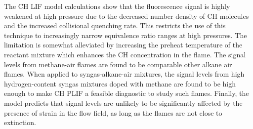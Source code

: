 The CH LIF model calculations show that the fluorescence signal is highly weakened at high pressure due to the decreased number density of CH molecules and the increased collisional quenching rate.
This restricts the use of this technique to increasingly narrow equivalence ratio ranges at high pressures.
The limitation is somewhat alleviated by increasing the preheat temperature of the reactant mixture which enhances the CH concentration in the flame.
The signal levels from methane-air flames are found to be comparable other alkane air flames.
When applied to syngas-alkane-air mixtures, the signal levels from high hydrogen-content syngas mixtures doped with methane are found to be high enough to make CH PLIF a feasible diagnostic to study such flames.
Finally, the model predicts that signal levels are unlikely to be significantly affected by the presence of strain in the flow field, as long as the flames are not close to extinction.

